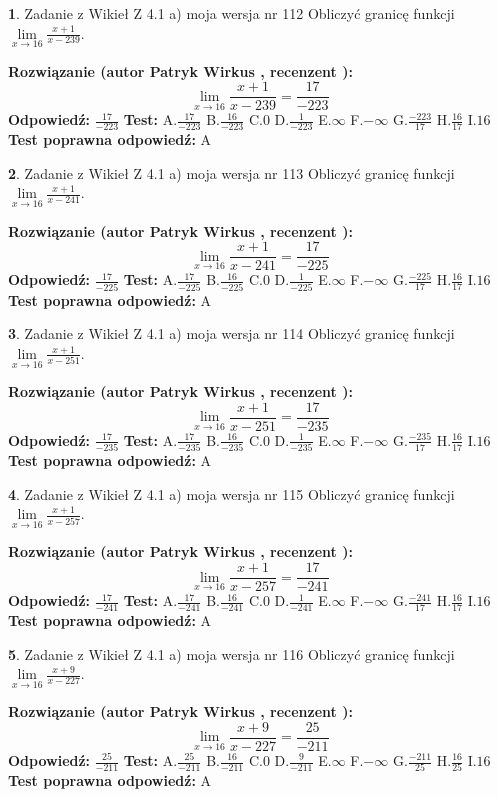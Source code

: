 \documentclass[12pt, a4paper]{article}
\theoremstyle{definition} %
\newtheorem{zad}{}
\newcommand{\zadStart}[1]{\begin{zad}#1\newline}
\newcommand{\zadStop}{\end{zad}}
\newcommand{\rozwStart}[2]{\noindent \textbf{Rozwiązanie (autor #1 , recenzent #2): }\newline}
\newcommand{\rozwStop}{\newline}
\newcommand{\odpStart}{\noindent \textbf{Odpowiedź:}\newline}
\newcommand{\odpStop}{\newline}
\newcommand{\testStart}{\noindent \textbf{Test:}\newline}
\newcommand{\testStop}{\newline}
\newcommand{\kluczStart}{\noindent \textbf{Test poprawna odpowiedź:}\newline}
\newcommand{\kluczStop}{\newline}
\begin{document}
\zadStart{Zadanie z Wikieł Z 4.1 a) moja wersja nr 112}
Obliczyć granicę funkcji $\lim\limits_{x\to16}\frac{x+1}{x-239}$.
\zadStop
\rozwStart{Patryk Wirkus}{}
$$\lim\limits_{x\to16}\frac{x+1}{x-239} = \frac{17}{-223}$$
\rozwStop
\odpStart
$\frac{17}{-223}$
\odpStop
\testStart
A.$\frac{17}{-223}$
B.$\frac{16}{-223}$
C.$0$
D.$\frac{1}{-223}$
E.$\infty$
F.$-\infty$
G.$\frac{-223}{17}$
H.$\frac{16}{17}$
I.$16$
\testStop
\kluczStart
A
\kluczStop



\zadStart{Zadanie z Wikieł Z 4.1 a) moja wersja nr 113}
Obliczyć granicę funkcji $\lim\limits_{x\to16}\frac{x+1}{x-241}$.
\zadStop
\rozwStart{Patryk Wirkus}{}
$$\lim\limits_{x\to16}\frac{x+1}{x-241} = \frac{17}{-225}$$
\rozwStop
\odpStart
$\frac{17}{-225}$
\odpStop
\testStart
A.$\frac{17}{-225}$
B.$\frac{16}{-225}$
C.$0$
D.$\frac{1}{-225}$
E.$\infty$
F.$-\infty$
G.$\frac{-225}{17}$
H.$\frac{16}{17}$
I.$16$
\testStop
\kluczStart
A
\kluczStop



\zadStart{Zadanie z Wikieł Z 4.1 a) moja wersja nr 114}
Obliczyć granicę funkcji $\lim\limits_{x\to16}\frac{x+1}{x-251}$.
\zadStop
\rozwStart{Patryk Wirkus}{}
$$\lim\limits_{x\to16}\frac{x+1}{x-251} = \frac{17}{-235}$$
\rozwStop
\odpStart
$\frac{17}{-235}$
\odpStop
\testStart
A.$\frac{17}{-235}$
B.$\frac{16}{-235}$
C.$0$
D.$\frac{1}{-235}$
E.$\infty$
F.$-\infty$
G.$\frac{-235}{17}$
H.$\frac{16}{17}$
I.$16$
\testStop
\kluczStart
A
\kluczStop



\zadStart{Zadanie z Wikieł Z 4.1 a) moja wersja nr 115}
Obliczyć granicę funkcji $\lim\limits_{x\to16}\frac{x+1}{x-257}$.
\zadStop
\rozwStart{Patryk Wirkus}{}
$$\lim\limits_{x\to16}\frac{x+1}{x-257} = \frac{17}{-241}$$
\rozwStop
\odpStart
$\frac{17}{-241}$
\odpStop
\testStart
A.$\frac{17}{-241}$
B.$\frac{16}{-241}$
C.$0$
D.$\frac{1}{-241}$
E.$\infty$
F.$-\infty$
G.$\frac{-241}{17}$
H.$\frac{16}{17}$
I.$16$
\testStop
\kluczStart
A
\kluczStop



\zadStart{Zadanie z Wikieł Z 4.1 a) moja wersja nr 116}
Obliczyć granicę funkcji $\lim\limits_{x\to16}\frac{x+9}{x-227}$.
\zadStop
\rozwStart{Patryk Wirkus}{}
$$\lim\limits_{x\to16}\frac{x+9}{x-227} = \frac{25}{-211}$$
\rozwStop
\odpStart
$\frac{25}{-211}$
\odpStop
\testStart
A.$\frac{25}{-211}$
B.$\frac{16}{-211}$
C.$0$
D.$\frac{9}{-211}$
E.$\infty$
F.$-\infty$
G.$\frac{-211}{25}$
H.$\frac{16}{25}$
I.$16$
\testStop
\kluczStart
A
\kluczStop
\end{document}
